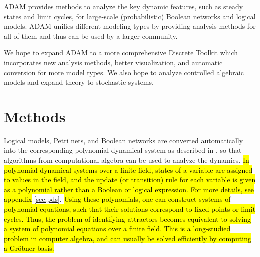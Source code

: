 \documentclass[10pt]{bmc_article}
\newenvironment{bmcformat}{\begin{raggedright}\baselineskip20pt\sloppy\setboolean{publ}{false}}{\end{raggedright}\baselineskip20pt\sloppy}
\newcommand{\comment}[1]{}
\begin{document}
\begin{bmcformat}
\comment{Several software tools for discrete models exists, all of them specializing in a single discrete model type.
{\it GINsim}, a tool for modeling and simulation of logical models can quickly identify steady states \cite{GINsim}, but it has no other means than simulation of every trajectory to identify limit cycles for synchronous networks. {\it BoolNet R package}, a package for inference and analysis of synchronous, asynchronous, and probabilistic Boolean networks, does a steady state analysis by exhaustive enumeration of the state space or using heuristic methods \cite{boolnet}. Analysis is limited by model size (exhaustive enumeration or Markov Chain analysis ) or restricted to heuristic methods, which might fail to detect some key dynamic features.
{\it Snoopy} and {\it Charlie}, tools for Petri nets, provide marking-independent analysis based on linear algebra, e.g., methods to determine T-invariants, which can be interpreted as the relative firing rates, occurring permanently, and this activity level corresponds to the steady state behavior.
{\it DDLab}, an interactive graphics software for cellular automata, Boolean and multi-valued networks, does not provide analysis methods other than through visualization, which is limited by model size or restricted to a small portion of the state space.}

ADAM provides methods to analyze the key dynamic features, such as steady states and limit cycles, for large-scale (probabilistic) Boolean networks and logical models. ADAM unifies different modeling types by providing analysis methods for all of them and thus can be used by a larger community.

We hope to expand ADAM to a more comprehensive Discrete Toolkit which incorporates new analysis methods, better visualization, and automatic conversion for more model types.
We also hope to analyze controlled algebraic models and expand theory to stochastic systems.




  
\section*{Methods}
Logical models, Petri nets, and Boolean networks are converted automatically
into the corresponding polynomial dynamical system as described in
\cite{Alan:Bioinf2010}, so that algorithms from computational
algebra can be used to analyze the dynamics. \hl{In polynomial dynamical systems over a finite field, states of a variable are assigned to values in the field, and the update (or transition) rule for each variable is given as a polynomial rather than a Boolean or logical expression. For more details, see appendix} \ref{sec:pds}. \hl{Using these polynomials, one can construct systems of polynomial equations, such that their solutions correspond to fixed points or limit cycles. Thus, the problem of identifying attractors becomes equivalent to solving a system of polynomial equations over a finite field. This is a long-studied problem in computer algebra, and can usually be solved efficiently by computing a Gr\"obner basis.}


\end{bmcformat}
\end{document}

